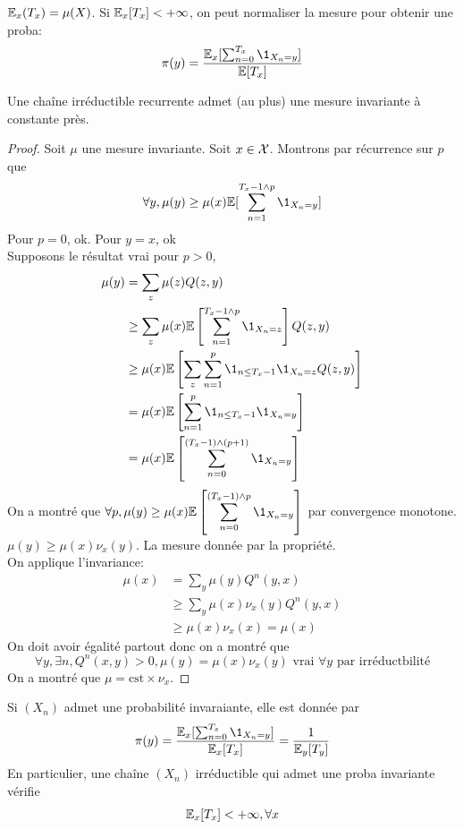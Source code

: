 \documentclass[]{report}
\begin{document}
    \begin{re}{}{}
        $\mathbb{E}_x(T_x)=\mu(X)$. Si $\mathbb{E}_x[T_x]<+\infty$, on peut normaliser la mesure pour obtenir une proba:
        \[\pi(y)=\dfrac{\Ea_x[\sum^{T_x}_{n=0}\1_{X_n=y}]}{\Ea[T_x]}\]
    \end{re}

    \begin{tm}{}{}
        Une chaîne irréductible recurrente admet (au plus) une mesure invariante à constante près.
    \end{tm}

    \begin{proof}
        Soit $\mu$ une mesure invariante. Soit $x\in \mathcal{X}$. Montrons par récurrence sur $p$ que
        \[\forall y,\mu(y)\ge \mu(x)\Ea[\sum_{n=1}^{T_{x}-1\wedge p}\1_{X_n=y}]\]
        Pour $p=0$, ok. Pour $y=x$, ok\\
        Supposons le résultat vrai pour $p>0$,
        \begin{align*}
            \mu(y)&=\sum_z\mu(z)Q(z,y)\\
            &\ge \sum_z \mu(x)\Ea\left[\sum_{n=1}^{T_x-1\wedge p}\1_{X_n=z}\right]Q(z,y)\\
            &\ge \mu(x)\Ea\left[\sum_z \sum_{n=1}^{p}\1_{n\le T_x-1}\1_{X_n=z}Q(z,y)\right]\\
            &=\mu(x)\Ea\left[\sum_{n=1}^{p}\1_{n\le T_x-1}\1_{X_n=y}\right]\\
            &=\mu(x)\Ea\left[\sum_{n=0}^{(T_x-1)\wedge (p+1)} \1_{X_n=y}\right]
        \end{align*}
        On a montré que $\displaystyle{\forall p, \mu(y)\ge \mu(x)\Ea\left[\sum_{n=0}^{(T_x-1)\wedge p}\1_{X_n=y}\right]}$ par convergence monotone. $\mu(y)\ge \mu(x)\nu_x(y)$. La mesure donnée par la propriété.\\
        On applique l'invariance:
        \begin{align*}
            \mu(x)&=\sum_y \mu(y) Q^n(y,x)\\
            &\ge \sum_y \mu(x)\nu_x(y)Q^n(y,x)\\
            &\ge \mu(x)\nu_x(x)=\mu(x)
        \end{align*}
        On doit avoir égalité partout donc on a montré que
        \[\forall y,\exists n, Q^n(x,y)>0,\mu(y)=\mu(x)\nu_x(y)\text{ vrai $\forall y$ par irréductbilité}\]
        On a montré que $\mu=\text{cst}\times \nu_x$.
    \end{proof}

    \begin{cor}{}{}
        Si $(X_n)$ admet une probabilité invaraiante, elle est donnée par
        \[\pi(y)=\dfrac{\Ea_x[\sum^{T_x}_{n=0}\1_{X_n=y}]}{\Ea_x[T_x]}=\frac{1}{\Ea_y[T_y]}\]
        En particulier, une chaîne $(X_n)$ irréductible qui admet une proba invariante vérifie 
        \[\mathbb{E}_x[T_x]<+\infty,\forall x\]
    \end{cor}
\end{document}
